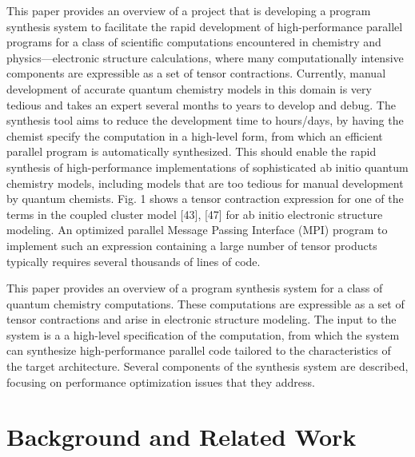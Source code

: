 \documentclass{sig-alternate}
\begin{document}
This paper provides an overview of a project that is developing
a program synthesis system to facilitate the rapid
development of high-performance parallel programs for a
class of scientific computations encountered in chemistry
and physics—electronic structure calculations, where many
computationally intensive components are expressible as a
set of tensor contractions. Currently, manual development
of accurate quantum chemistry models in this domain is
very tedious and takes an expert several months to years
to develop and debug. The synthesis tool aims to reduce
the development time to hours/days, by having the chemist
specify the computation in a high-level form, from which an
efficient parallel program is automatically synthesized. This
should enable the rapid synthesis of high-performance implementations
of sophisticated ab initio quantum chemistry
models, including models that are too tedious for manual
development by quantum chemists. Fig. 1 shows a tensor
contraction expression for one of the terms in the coupled
cluster model [43], [47] for ab initio electronic structure
modeling. An optimized parallel Message Passing Interface
(MPI) program to implement such an expression containing
a large number of tensor products typically requires several
thousands of lines of code.


This paper provides an overview of a program synthesis system
for a class of quantum chemistry computations. These computations
are expressible as a set of tensor contractions and arise in electronic
structure modeling. The input to the system is a a high-level specification
of the computation, from which the system can synthesize
high-performance parallel code tailored to the characteristics of the
target architecture. Several components of the synthesis system are described, focusing on performance optimization issues that they
address.




\section{Background and Related Work}



\begin{comment}
\begin{table}
\centering
\caption{Frequency of Special Characters}
\begin{tabular}{|c|c|l|} \hline
Non-English or Math&Frequency&Comments\\ \hline
\O & 1 in 1,000& For Swedish names\\ \hline
$\pi$ & 1 in 5e& Common in math\\ \hline
\$ & 4 in 5 & Used in business\\ \hline
$\Psi^2_1$ & 1 in 40,000& Unexplained usage\\
\hline\end{tabular}
\end{table}
\end{comment}
\end{document}
